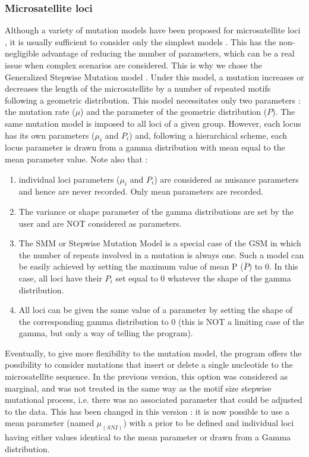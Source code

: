 \subsubsection{Microsatellite loci}
 Although a variety of mutation models have been
proposed for microsatellite loci \citep{W2003}, it is usually
sufficient to consider only the simplest models \citep{C2006}. This
has the non-negligible advantage of reducing the number of parameters, which
can be a real issue when complex scenarios are considered. This is why we chose the Generalized Stepwise Mutation model \citep{E2002}. Under this model, a mutation increases or decreases the length of the microsatellite by a number of repeated motifs  following a geometric
distribution. This model necessitates only two parameters : the mutation rate  (\texttt{$\mu$}) and the parameter of the
geometric distribution (\texttt{$P$}). The same mutation model is imposed to all loci of a given group. However, each locus has its own parameters   (\texttt{$\mu_i$} and \texttt{$P_i$}) and, following a hierarchical scheme, each locus parameter is drawn from a gamma distribution with mean equal to the mean parameter value. Note also that :
\begin{enumerate}
\item individual loci parameters (\texttt{$\mu_i$} and \texttt{$P_i$}) are considered as nuisance parameters and hence are never recorded. Only mean parameters are recorded.
\item The variance or shape parameter of the gamma distributions are set by the user and are NOT considered as parameters.
\item The SMM or Stepwise Mutation Model is a special case of the GSM in which the number of repeats involved in a mutation is always one. Such a model can be easily achieved by setting the maximum value of mean P ($\bar{P}$) to 0. In this case, all loci have their $P_i$ set equal to 0 whatever the shape of the gamma distribution.
\item All loci can be given the same value of a parameter by setting the shape of the corresponding gamma distribution to 0 (this is NOT a limiting case of the gamma, but only a way of telling the program). 
\end{enumerate}
Eventually, to give more flexibility to the mutation model, the program offers the possibility to consider mutations that insert or delete a single nucleotide to the microsatellite sequence.  
In the previous version, this option was considered as marginal, and was not treated in the same way as the motif size stepwise mutational process, i.e. there was no associated parameter that could be adjusted to the data. This has been changed in this version :  it is now possible to use a mean parameter (named $ \mu_{(SNI)}$) with a prior to be defined and individual loci having either values identical to the mean parameter or drawn from a Gamma distribution.

